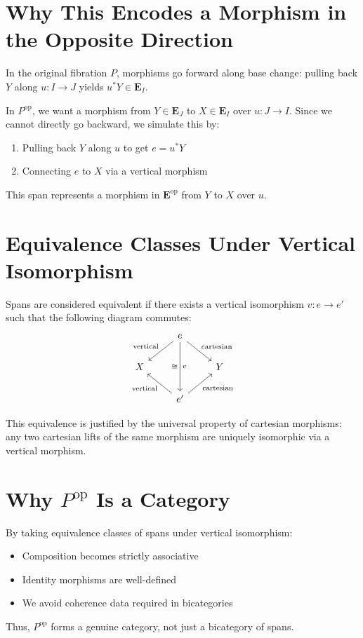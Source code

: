 \documentclass[12pt]{article}
\begin{document}
	\section*{Why This Encodes a Morphism in the Opposite Direction}
	
	In the original fibration \( P \), morphisms go forward along base change: pulling back \( Y \) along \( u : I \to J \) yields \( u^*Y \in \mathbf{E}_I \).
	
	In \( P^{\mathrm{op}} \), we want a morphism from \( Y \in \mathbf{E}_J \) to \( X \in \mathbf{E}_I \) over \( u : J \to I \). Since we cannot directly go backward, we simulate this by:
	\begin{enumerate}
		\item Pulling back \( Y \) along \( u \) to get \( e = u^*Y \)
		\item Connecting \( e \) to \( X \) via a vertical morphism
	\end{enumerate}
	
	This span represents a morphism in \( \mathbf{E}^{\mathrm{op}} \) from \( Y \) to \( X \) over \( u \).
	
	\section*{Equivalence Classes Under Vertical Isomorphism}
	
	Spans are considered equivalent if there exists a vertical isomorphism \( v : e \to e' \) such that the following diagram commutes:
	\[
	\begin{tikzcd}
		& e \arrow[dl, "\text{vertical}"'] \arrow[dr, "\text{cartesian}"] \arrow[dd, "v", "\cong"'] & \\
		X & & Y \\
		& e' \arrow[ul, "\text{vertical}"] \arrow[ur, "\text{cartesian}"'] &
	\end{tikzcd}
	\]
	
	This equivalence is justified by the universal property of cartesian morphisms: any two cartesian lifts of the same morphism are uniquely isomorphic via a vertical morphism.
	
	\section*{Why \( P^{\mathrm{op}} \) Is a Category}
	
	By taking equivalence classes of spans under vertical isomorphism:
	\begin{itemize}
		\item Composition becomes strictly associative
		\item Identity morphisms are well-defined
		\item We avoid coherence data required in bicategories
	\end{itemize}
	
	Thus, \( P^{\mathrm{op}} \) forms a genuine category, not just a bicategory of spans.
	
\end{document}
